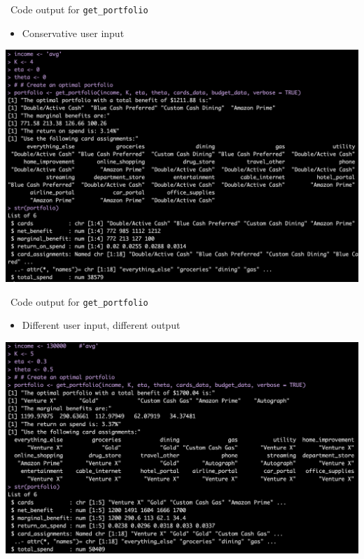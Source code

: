 \begin{frame}{\sR\ Code output for \texttt{get\_portfolio}}
    \begin{itemize}
        \item Conservative user input
    \end{itemize}
    \begin{center}
        \includegraphics[width=1\textwidth]{../Misc/RCode_portfolio_output1.png}
    \end{center}
\end{frame} 

\begin{frame}{\sR\ Code output for \texttt{get\_portfolio}}
    \begin{itemize}
        \item Different user input, different output
    \end{itemize}
    \begin{center}
        \includegraphics[width=1\textwidth]{../Misc/RCode_portfolio_output2.png}
    \end{center}
\end{frame} 

